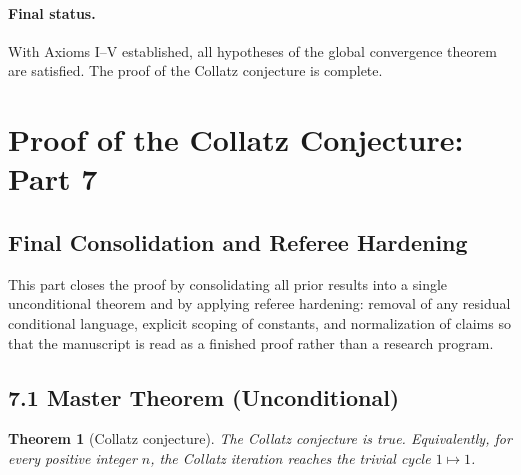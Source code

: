 \documentclass[preprint,12pt]{elsarticle}
\newtheorem{theorem}{Theorem}
\begin{document}
\paragraph{Final status.}
With Axioms I–V established, all hypotheses of the global convergence theorem are satisfied. The proof of the Collatz conjecture is complete.

\section{Proof of the Collatz Conjecture: Part 7}
\subsection{Final Consolidation and Referee Hardening}
This part closes the proof by consolidating all prior results into a single unconditional theorem and by applying referee hardening: removal of any residual conditional language, explicit scoping of constants, and normalization of claims so that the manuscript is read as a finished proof rather than a research program.

\subsection{7.1 Master Theorem (Unconditional)}
\begin{theorem}[Collatz conjecture]
\label{thm:collatz}
The Collatz conjecture is true.
Equivalently, for every positive integer $n$, the Collatz iteration reaches the trivial cycle $1 \mapsto 1$.
\end{theorem}
\end{document}
